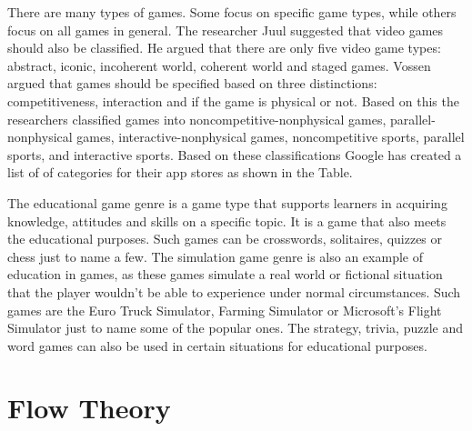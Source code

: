 \documentclass[10pt,oneside,english,a4paper]{article}
\begin{document}
\par
There are many types of games. Some focus on specific game types, while others focus on all games in general. The researcher Juul suggested that video games should also be classified. He argued that there are only five video game types: abstract, iconic, incoherent world, coherent world and staged games. Vossen argued that games should be specified based on three distinctions: competitiveness, interaction and if the game is physical or not. Based on this the researchers classified games into noncompetitive-nonphysical games, parallel-nonphysical games, interactive-nonphysical games, noncompetitive sports, parallel sports, and interactive sports. Based on these classifications Google has created a list of of categories for their app stores as shown in the Table. \cite{Hu:gamification} 
\par
The educational game genre is a game type that supports learners in acquiring knowledge, attitudes and skills on a specific topic. It is a game that also meets the educational purposes. Such games can be crosswords, solitaires, quizzes or chess just to name a few.
The simulation game genre is also an example of education in games, as these games simulate a real world or fictional situation that the player wouldn't be able to experience under normal circumstances. Such games are the Euro Truck Simulator, Farming Simulator or Microsoft's Flight Simulator just to name some of the popular ones. 
The strategy, trivia, puzzle and word games can also be used in certain situations for educational purposes.

\section{Flow Theory} \label{flow theory}
\end{document}
